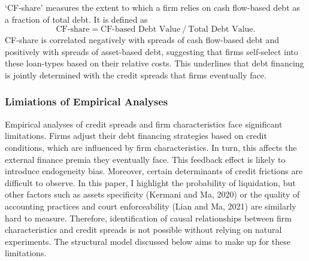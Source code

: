 \documentclass[12pt]{article}
\begin{document}
`CF-share' measures the extent to which a firm relies on cash flow-based debt as a fraction of total debt. It is defined as 
\begin{equation*}
    \text{CF-share} = \text{CF-based Debt Value} \  / \  \text{Total Debt Value}.
\end{equation*}
CF-share is correlated negatively with spreads of cash flow-based debt and positively with spreads of asset-based debt, suggesting that firms self-select into these loan-types based on their relative costs. This underlines that debt financing is jointly determined with the credit spreads that firms eventually face. 

\subsubsection{Limiations of Empirical Analyses \label{sec:credit spreads}} 
Empirical analyses of credit spreads and firm characteristics face significant limitations. Firms adjust their debt financing strategies based on credit conditions, which are influenced by firm characteristics. In turn, this affects the external finance premia they eventually face. This feedback effect is likely to introduce endogeneity bias. Moreover, certain determinants of credit frictions are difficult to observe. In this paper, I highlight the probability of liquidation, but other factors such as assets specificity (Kermani and Ma, 2020) or the quality of accounting practices and court enforceability (Lian and Ma, 2021) are similarly hard to measure. Therefore, identification of causal relationships between firm characteristics and credit spreads is not possible without relying on natural experiments. The structural model discussed below aims to make up for these limitations. 
\end{document}
